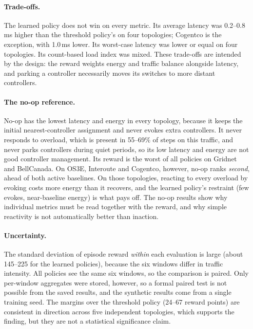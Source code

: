 \paragraph{Trade-offs.} The learned policy does not win on every metric. Its average latency was 0.2--0.8\,ms higher than the threshold policy's on four topologies; Cogentco is the exception, with 1.0\,ms lower. Its worst-case latency was lower or equal on four topologies. Its count-based load index was mixed. These trade-offs are intended by the design: the reward weights energy and traffic balance alongside latency, and parking a controller necessarily moves its switches to more distant controllers.

\paragraph{The no-op reference.} No-op has the lowest latency and energy in every topology, because it keeps the initial nearest-controller assignment and never evokes extra controllers. It never responds to overload, which is present in 55--69\% of steps on this traffic, and never parks controllers during quiet periods, so its low latency and energy are not good controller management. Its reward is the worst of all policies on Gridnet and BellCanada. On OS3E, Interoute and Cogentco, however, no-op ranks \emph{second}, ahead of both active baselines. On those topologies, reacting to every overload by evoking costs more energy than it recovers, and the learned policy's restraint (few evokes, near-baseline energy) is what pays off. The no-op results show why individual metrics must be read together with the reward, and why simple reactivity is not automatically better than inaction.

\paragraph{Uncertainty.} The standard deviation of episode reward \emph{within} each evaluation is large (about 145--225 for the learned policies), because the six windows differ in traffic intensity. All policies see the same six windows, so the comparison is paired. Only per-window aggregates were stored, however, so a formal paired test is not possible from the saved results, and the synthetic results come from a single training seed. The margins over the threshold policy (24--67 reward points) are consistent in direction across five independent topologies, which supports the finding, but they are not a statistical significance claim.

